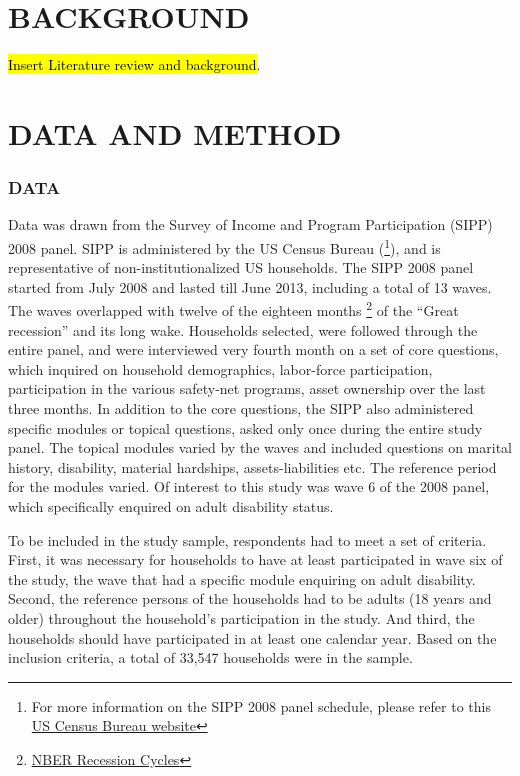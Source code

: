 \documentclass[11pt]{extarticle} %
\begin{document}
\section*{BACKGROUND}
\noindent
{\hl{Insert Literature review and background}}.

\section*{DATA AND METHOD}
\subsubsection*{DATA}
Data was drawn from the Survey of Income and Program Participation (SIPP) 2008 panel. SIPP is administered by the US Census Bureau ({\footnote{For more information on the SIPP 2008 panel schedule, please refer to this \href{http://www.census.gov/programs-surveys/sipp/data/2008-panel.html}{US Census Bureau website}}}), and is representative of non-institutionalized US households. The SIPP 2008 panel started from July 2008 and lasted till June 2013, including a total of 13 waves. The waves overlapped with twelve of the eighteen months {\footnote{\href{http://www.nber.org/cycles/}{NBER Recession Cycles}}} of the “Great recession” and its long wake. Households selected, were followed through the entire panel, and were interviewed very fourth month on a set of core questions, which inquired on household demographics, labor-force participation, participation in the various safety-net programs, asset ownership over the last three months. In addition to the core questions, the SIPP also administered specific modules or topical questions, asked only once during the entire study panel. The topical modules varied by the waves and included questions on marital history, disability, material hardships, assets-liabilities etc. The reference period for the modules varied. Of interest to this study was wave 6 of the 2008 panel, which specifically enquired on adult disability status.

To be included in the study sample, respondents had to meet a set of criteria. First, it was necessary for households to have at least participated in wave six of the study, the wave that had a specific module enquiring on adult disability. Second, the reference persons of the households had to be adults (18 years and older) throughout the household's participation in the study. And third, the households should have participated in at least one calendar year. Based on the inclusion criteria, a total of 33,547 households were in the sample.
\end{document}
